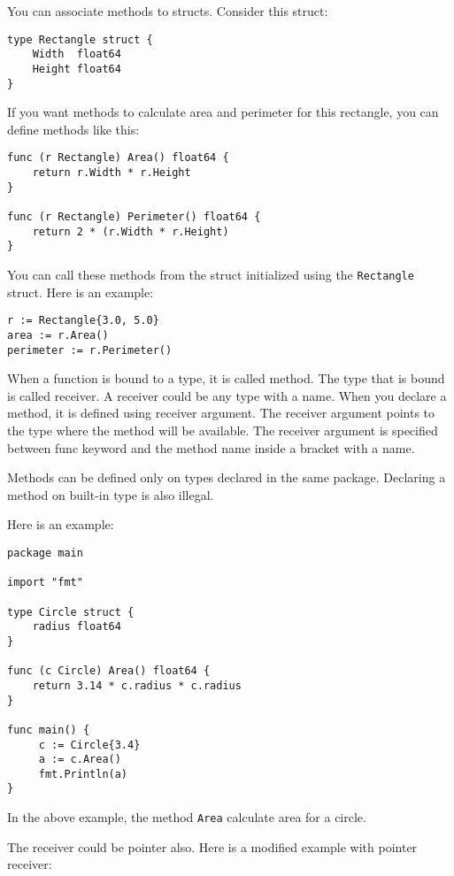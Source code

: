 You can associate methods to structs. Consider this
struct:

\begin{lstlisting}[numbers=none]
type Rectangle struct {
    Width  float64
    Height float64
}
\end{lstlisting}

If you want methods to calculate area and perimeter for this rectangle,
you can define methods like this:

\begin{lstlisting}[numbers=none]
func (r Rectangle) Area() float64 {
    return r.Width * r.Height
}

func (r Rectangle) Perimeter() float64 {
    return 2 * (r.Width * r.Height)
}
\end{lstlisting}

You can call these methods from the struct initialized using
the \texttt{Rectangle} struct.  Here is an example:

\begin{lstlisting}[numbers=none]
r := Rectangle{3.0, 5.0}
area := r.Area()
perimeter := r.Perimeter()
\end{lstlisting}

When a function is bound to a type, it is called method.
The type that is bound is called receiver.  A receiver could be any
type with a name.  When you declare a method, it is defined using
receiver argument.  The receiver argument points to the type where the
method will be available.  The receiver argument is specified between
func keyword and the method name inside a bracket with a name.

Methods can be defined only on types declared in the same package.
Declaring a method on built-in type is also illegal.

Here is an example:

\begin{lstlisting}[caption=Method]
package main

import "fmt"

type Circle struct {
    radius float64
}

func (c Circle) Area() float64 {
    return 3.14 * c.radius * c.radius
}

func main() {
     c := Circle{3.4}
     a := c.Area()
     fmt.Println(a)
}
\end{lstlisting}


In the above example, the method \texttt{Area} calculate area for a
circle.

The receiver could be pointer also.  Here is a modified example with
pointer receiver:

